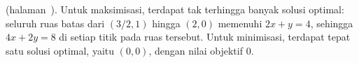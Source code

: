 


\medskip

\noindent\textbf{} (halaman~\pageref{lc:how-many-optima}).
Untuk maksimisasi, terdapat tak terhingga banyak solusi optimal: seluruh ruas
batas dari $(3/2,1)$ hingga $(2,0)$ memenuhi $2x+y=4$, sehingga
$4x+2y=8$ di setiap titik pada ruas tersebut. Untuk minimisasi, terdapat tepat
satu solusi optimal, yaitu $(0,0)$, dengan nilai objektif $0$.
